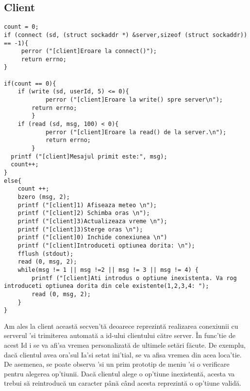 \documentclass{llncs}
\begin{document}
\subsection{Client}
%
\begin{lstlisting}
count = 0;
if (connect (sd, (struct sockaddr *) &server,sizeof (struct sockaddr)) == -1){
	 perror ("[client]Eroare la connect()");
	 return errno;
}

if(count == 0){
	if (write (sd, userId, 5) <= 0){
     		perror ("[client]Eroare la write() spre server\n");
		return errno;
    	}
	if (read (sd, msg, 100) < 0){
      		perror ("[client]Eroare la read() de la server.\n");
      		return errno;
    	}
  printf ("[client]Mesajul primit este:", msg);
  count++;
}
else{
	count ++;
	bzero (msg, 2);
	printf ("[client]1) Afiseaza meteo \n");
	printf ("[client]2) Schimba oras \n");
	printf ("[client]3)Actualizeaza vreme \n");
	printf ("[client]3)Sterge oras \n");
	printf ("[client]0) Inchide conexiunea \n")
	printf ("[client]Introduceti optiunea dorita: \n");
	fflush (stdout);
	read (0, msg, 2);
	while(msg != 1 || msg !=2 || msg != 3 || msg != 4) {
		printf ("[client]Ati introdus o optiune inexistenta. Va rog introduceti optiunea dorita din cele existente(1,2,3,4: ");
		read (0, msg, 2);
	}
}
\end{lstlisting}
%
Am ales la client această secven'tă deoarece reprezintă realizarea conexiunii cu serverul 'si trimiterea automată a id-ului clientului către server.
În func'tie de acest Id i se va afi'sa vremea personalizată de ultimele setări făcute. De exemplu, dacă clientul avea ora'sul Ia'si setat ini'tial,
se va afisa vremea din acea loca'tie. De asemenea, se poate observa 'si un prim prototip de meniu 'si o verificare
pentru alegerea op'tiunii. Dacă clientul alege o op'tiune inexistentă, acesta va trebui să reintroducă un caracter până când acesta reprezintă o op'tiune validă.
%
\end{document}
